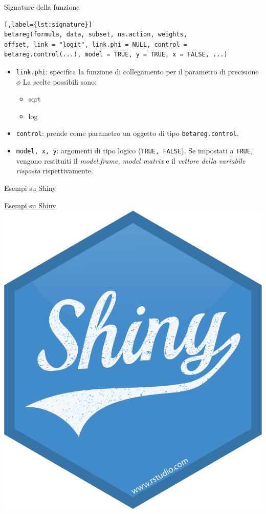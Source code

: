 \documentclass[usenames,dvipsnames]{beamer}
\begin{document}
\begin{frame}[fragile]{Signature della funzione}

\begin{lstlisting}[,label={lst:signature}]
betareg(formula, data, subset, na.action, weights, 
offset, link = "logit", link.phi = NULL, control = betareg.control(...), model = TRUE, y = TRUE, x = FALSE, ...)
\end{lstlisting}
\begin{itemize}[<+->]
\item \texttt{link.phi}: specifica la funzione di collegamento per il parametro di precisione $\phi$  La scelte possibili sono: 
		\begin{itemize}
			\item sqrt
			\item log
		\end{itemize}
\item \texttt{control}: prende come parametro un oggetto di tipo \texttt{betareg.control}.
\item \texttt{model, x, y}: argomenti di tipo logico (\texttt{TRUE, FALSE}). Se impostati a  \texttt{TRUE}, vengono restituiti il \emph{model.frame, model matrix} e il \emph{vettore della variabile risposta} rispettivamente.
\end{itemize}	
\end{frame}

\begin{frame}{Esempi su Shiny}
\vspace{0cm}

\begin{center}
	\href{http://127.0.0.1:5912}{Esempi su Shiny}\\
	\href{http://127.0.0.1:3491}{\includegraphics[scale=0.2]{Shiny}}

\end{center}
\end{frame}
\end{document}
